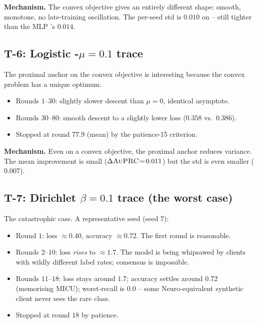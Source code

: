 \textbf{Mechanism.} The convex objective gives an entirely
different shape: smooth, monotone, no late-training oscillation.
The per-seed std is $0.010$ on \auprc{} -- still tighter than the
MLP \fedavg{}'s $0.014$.

\subsection{T-6: Logistic \fedprox{}-$\mu\!=\!0.1$ trace}

The proximal anchor on the convex objective is interesting because
the convex problem has a unique optimum.

\begin{itemize}[leftmargin=1.5em, itemsep=2pt, topsep=2pt]
    \item Rounds $1$--$30$: slightly slower descent than
        $\mu\!=\!0$, identical asymptote.
    \item Rounds $30$--$80$: smooth descent to a slightly lower
        loss ($0.358$ vs.\ $0.386$).
    \item Stopped at round $77.9$ (mean) by the patience-15
        criterion.
\end{itemize}

\textbf{Mechanism.} Even on a convex objective, the proximal
anchor reduces variance. The mean improvement is small
($\Delta\textsc{AuPRC}{}\!=\!0.011$) but the std is even smaller
($0.007$).

\subsection{T-7: Dirichlet $\beta\!=\!0.1$ trace (the worst case)}

The catastrophic case. A representative seed (seed $7$):

\begin{itemize}[leftmargin=1.5em, itemsep=2pt, topsep=2pt]
    \item Round $1$: loss $\approx 0.40$, accuracy $\approx
        0.72$. The first round is reasonable.
    \item Rounds $2$--$10$: loss \emph{rises} to $\approx 1.7$.
        The model is being whipsawed by clients with
        wildly different label rates; consensus is impossible.
    \item Rounds $11$--$18$: loss stays around $1.7$; accuracy
        settles around $0.72$ (memorising MICU); worst-recall
        is $0.0$ -- some Neuro-equivalent synthetic client never
        sees the rare class.
    \item Stopped at round $18$ by patience.
\end{itemize}

